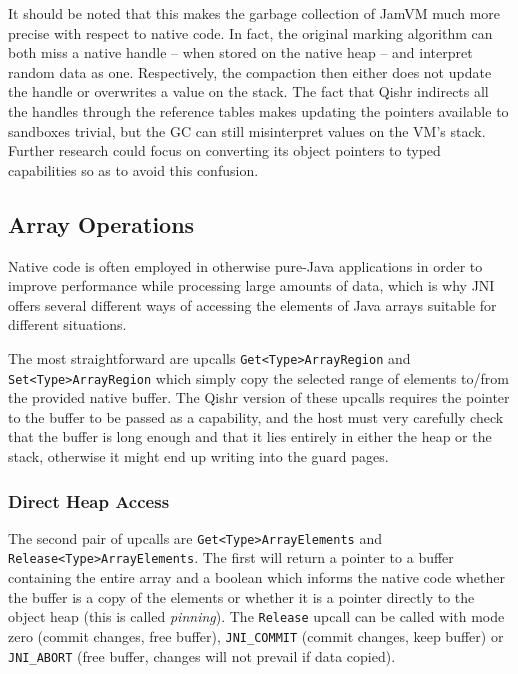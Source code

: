\documentclass[a4paper,12pt,twoside,openright]{report}
\begin{document}
It should be noted that this makes the garbage collection of JamVM much more precise with respect to native code. In fact, the original marking algorithm can both miss a native handle -- when stored on the native heap -- and interpret random data as one. Respectively, the compaction then either does not update the handle or overwrites a value on the stack. The fact that Qishr indirects all the handles through the reference tables makes updating the pointers available to sandboxes trivial, but the GC can still misinterpret values on the VM's stack. Further research could focus on converting its object pointers to typed capabilities so as to avoid this confusion.

\subsection{Array Operations}

Native code is often employed in otherwise pure-Java applications in order to improve performance while processing large amounts of data, which is why JNI offers several different ways of accessing the elements of Java arrays suitable for different situations.

The most straightforward are upcalls \texttt{Get\-<Type>\-Array\-Region} and \texttt{Set\-<Type>\-Array\-Region} which simply copy the selected range of elements to/from the provided native buffer. The Qishr version of these upcalls requires the pointer to the buffer to be passed as a capability, and the host must very carefully check that the buffer is long enough and that it lies entirely in either the heap or the stack, otherwise it might end up writing into the guard pages. 

\subsubsection{Direct Heap Access}
\label{sec:DirectHeapAccess}

The second pair of upcalls are \texttt{Get\-<Type>\-Array\-Elements} and \texttt{Release\-<Type>\-Array\-Elements}. The first will return a pointer to a buffer containing the entire array and a boolean which informs the native code whether the buffer is a copy of the elements or whether it is a pointer directly to the object heap (this is called \emph{pinning}). The \texttt{Release} upcall can be called with mode zero (commit changes, free buffer), \texttt{JNI\_COMMIT} (commit changes, keep buffer) or \texttt{JNI\_ABORT} (free buffer, changes will not prevail if data copied). 
\end{document}
